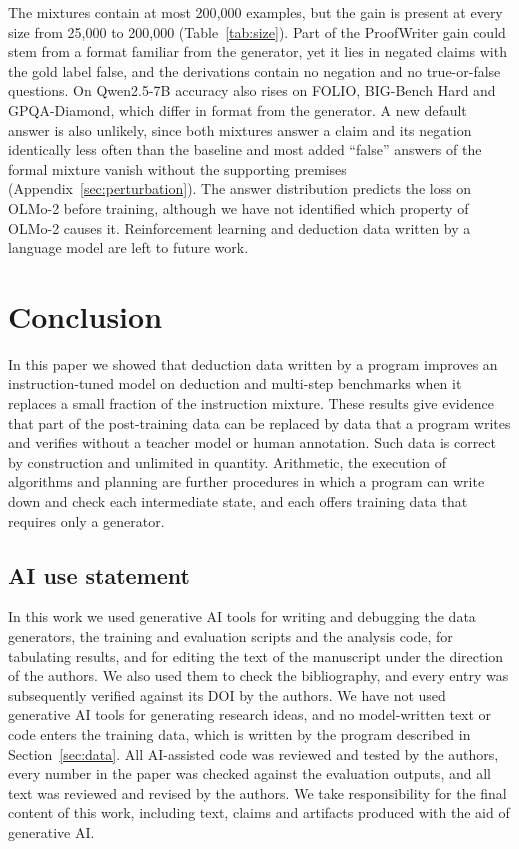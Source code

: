 \documentclass{article}
\begin{document}
The mixtures contain at most 200{,}000 examples, but the gain is present at
every size from 25{,}000 to 200{,}000 (Table~\ref{tab:size}). Part of the
ProofWriter gain could stem from a format familiar from the generator, yet it
lies in negated claims with the gold label false, and the derivations contain
no negation and no true-or-false questions. On Qwen2.5-7B accuracy also rises
on FOLIO, BIG-Bench Hard and GPQA-Diamond, which differ in format from the generator.
A new default answer is also unlikely, since both mixtures answer a claim and
its negation identically less often than the baseline and most added
``false'' answers of the formal mixture vanish without the supporting premises
(Appendix~\ref{sec:perturbation}). The answer distribution predicts the loss
on OLMo-2 before training, although we have not identified which property of
OLMo-2 causes it. Reinforcement learning and deduction data written by a
language model are left to future work.

\section{Conclusion}

In this paper we showed that deduction data written by a program improves an instruction-tuned model on deduction and multi-step benchmarks when it replaces a small fraction of the instruction mixture. These results give evidence that part of the post-training data can be replaced by data that a program writes and verifies without a teacher model or human annotation. Such data is correct by construction and unlimited in quantity. Arithmetic, the execution of algorithms and planning are further procedures in which a program can write down and check each intermediate state, and each offers training data that requires only a generator.

\subsection*{AI use statement}

In this work we used generative AI tools for writing and debugging the data generators, the training
and evaluation scripts and the analysis code, for tabulating results, and
for editing the text of the manuscript under the direction of
the authors. We also used them to check the bibliography, and every entry
was subsequently verified against its DOI by the authors. We have not used
generative AI tools for generating research ideas, and no model-written
text or code enters the training data, which is written by the program
described in Section~\ref{sec:data}. All AI-assisted code was reviewed and
tested by the authors, every number in the paper was checked against the
evaluation outputs, and all text was reviewed and revised by the authors.
We take responsibility for the final content of this work, including text,
claims and artifacts produced with the aid of generative AI.




\appendix

\end{document}
